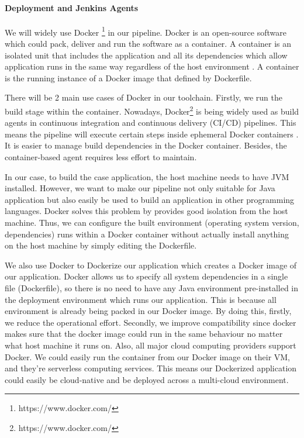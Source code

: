 \paragraph[]{Deployment and Jenkins Agents}
We will widely use Docker \footnote{https://www.docker.com/} in our pipeline.
Docker is an open-source software which could pack, deliver and run the software as a container. A container is an isolated unit that includes the application and all its dependencies which allow application runs in the same way regardless of the host environment \cite{WhatisaC60:online}. A container is the running instance of a Docker image that defined by Dockerfile.
\par
\label{docker}
There will be 2 main use cases of Docker in our toolchain. Firstly, we run the build stage within the container.
Nowadays, Docker\footnote{https://www.docker.com/} is being widely used as build agents in continuous integration and continuous delivery (CI/CD) pipelines.
This means the pipeline will execute certain steps inside ephemeral Docker containers \cite{Overview44:online}. It is easier to manage build dependencies in the Docker container. Besides, the container-based agent requires less effort to maintain.
\par
In our case, to build the case application, the host machine needs to have JVM installed. However, we want to make our pipeline not only suitable for Java application but also easily be used to build an application in other programming languages. Docker solves this problem by provides good isolation from the host machine. Thus, we can configure the built environment (operating system version, dependencies) runs within a Docker container without actually install anything on the host machine by simply editing the Dockerfile.
\par
We also use Docker to Dockerize our application which creates a Docker image of our application.
Docker allows us to specify all system dependencies in a single file (Dockerfile), so there is no need to have any Java environment pre-installed in the deployment environment which runs our application. This is because all environment is already being packed in our Docker image. By doing this, firstly, we reduce the operational effort. Secondly, we improve compatibility since docker makes sure that the docker image could run in the same behaviour no matter what host machine it runs on. Also, all major cloud computing providers support Docker. We could easily run the container from our Docker image on their VM, and they're serverless computing services. This means our Dockerized application could easily be cloud-native and be deployed across a multi-cloud environment.
